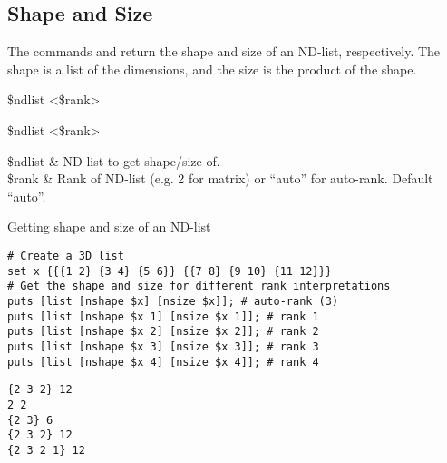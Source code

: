 \subsection{Shape and Size}
The commands  and  return the shape and size of an ND-list, respectively.
The shape is a list of the dimensions, and the size is the product of the shape.
\begin{syntax}
 \$ndlist <\$rank>
\end{syntax}
\begin{syntax}
 \$ndlist <\$rank>
\end{syntax}
\begin{args}
\$ndlist & ND-list to get shape/size of. \\
\$rank & Rank of ND-list (e.g. 2 for matrix) or ``auto'' for auto-rank. Default ``auto''.
\end{args}
\begin{example}{Getting shape and size of an ND-list}
\begin{lstlisting}
# Create a 3D list
set x {{{1 2} {3 4} {5 6}} {{7 8} {9 10} {11 12}}}
# Get the shape and size for different rank interpretations
puts [list [nshape $x] [nsize $x]]; # auto-rank (3)
puts [list [nshape $x 1] [nsize $x 1]]; # rank 1
puts [list [nshape $x 2] [nsize $x 2]]; # rank 2
puts [list [nshape $x 3] [nsize $x 3]]; # rank 3
puts [list [nshape $x 4] [nsize $x 4]]; # rank 4
\end{lstlisting}
\tcblower
\begin{lstlisting}
{2 3 2} 12
2 2
{2 3} 6
{2 3 2} 12
{2 3 2 1} 12
\end{lstlisting}
\end{example}

\clearpage
